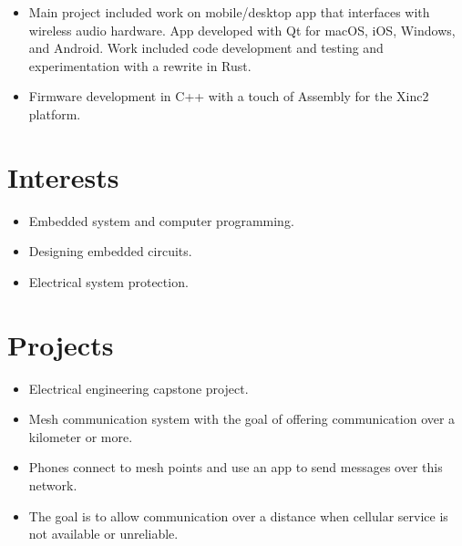 \documentclass{lsanche_cv}
\begin{document}
\begin{multicols*}{2}
	\divider

    \begin{itemize}
	  \item Main project included work on mobile/desktop app that interfaces with wireless audio hardware. App developed with Qt for macOS, iOS, Windows, and Android. Work included code development and testing and experimentation with a rewrite in Rust.
		\item Firmware development in C++ with a touch of Assembly for the Xinc2 platform.
    \end{itemize}

    \columnbreak
    
  \section{Interests}
    \begin{itemize}
      \item Embedded system and computer programming.
      \item Designing embedded circuits.
			\item Electrical system protection.
    \end{itemize}

    \section{Projects}

      \begin{itemize}
        \item Electrical engineering capstone project.
        \item Mesh communication system with the goal of offering communication over a kilometer or more. 
        \item Phones connect to mesh points and use an app to send messages over this network.
        \item The goal is to allow communication over a distance when cellular service is not available or unreliable.
      \end{itemize}

    \divider


\end{multicols*}
\end{document}
